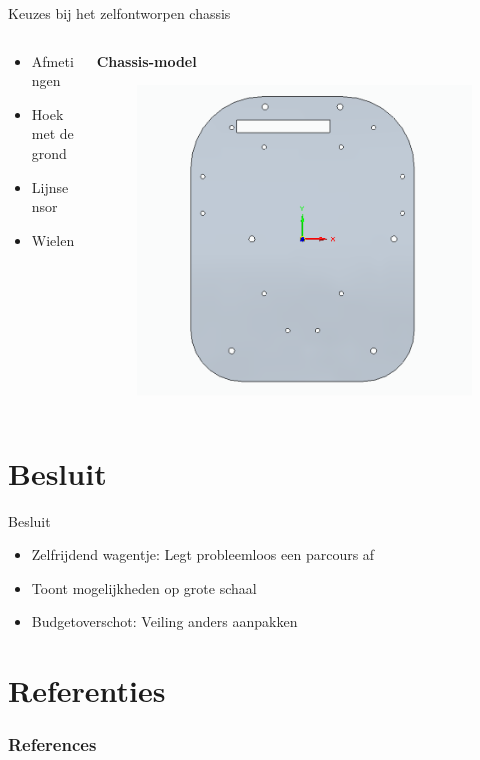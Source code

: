 \documentclass[aspectratio=169,kulak,t,handout]{kulakbeamer} %
\begin{document}
\begin{frame}{Keuzes bij het zelfontworpen chassis}
	\begin{columns}
	\begin{column}{0.50\textwidth}\centering
		\begin{itemize}
			\Large\item Afmetingen
			\item Hoek met de grond
			\item Lijnsensor
			\item Wielen
		\end{itemize}
	\end{column}
	\begin{column}{0.75\textwidth}\centering
		{\bf{Chassis-model}}\\[.2cm]
		\begin{figure}
			\centering
			\includegraphics[width=.55\textwidth]{chassis3d}
			
			\label{fig:chassis}
		\end{figure}
	\end{column}
\end{columns}	
\end{frame}

\section{Besluit}






\begin{frame}{Besluit}
\begin{itemize}
	\large \item Zelfrijdend wagentje: Legt probleemloos een parcours af
	\item Toont mogelijkheden op grote schaal
	\item Budgetoverschot: Veiling anders aanpakken
	
\end{itemize}	
	
\end{frame}





	
\section{Referenties}

\begin{frame}[allowframebreaks]
	\frametitle{References}
	\nocite{*}
	
	
\end{frame}
\end{document}
